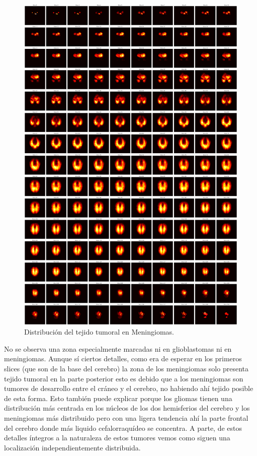 \begin{figure}[!h]
	\centering
	\includegraphics[width=1.0\linewidth]{imagenes/metodologia_heatmapsMEN.png}
	\caption{Distribución del tejido tumoral en Meningiomas.}
\end{figure}


No se observa una zona especialmente marcadas ni en glioblastomas ni en meningiomas. Aunque sí ciertos detalles, como era de esperar en los primeros slices (que son de la base del cerebro) la zona de los meningiomas solo presenta tejido tumoral en la parte posterior esto es debido que a los meningiomas son tumores de desarrollo entre el cráneo y el cerebro, no habiendo ahí tejido posible de esta forma. Esto también puede explicar porque los gliomas tienen una distribución más centrada en los núcleos de los dos hemisferios del cerebro y los meningiomas más distribuido pero con una ligera tendencia ahí la parte frontal del cerebro donde más liquido cefalorraquídeo se concentra. A parte, de estos detalles íntegros a la naturaleza de estos tumores vemos como siguen una localización independientemente distribuida. 

